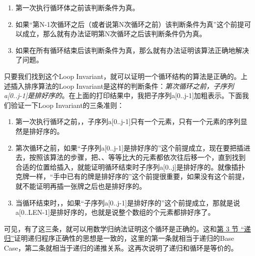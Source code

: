 \begin{enumerate}

\item 第一次执行循环体之前该判断条件为真。

\item 如果“第N-1次循环之后（或者说第N次循环之前）该判断条件为真”这个前提可以成立，那么就有办法证明第N次循环之后该判断条件仍为真。

\item 如果在所有循环结束后该判断条件为真，那么就有办法证明该算法正确地解决了问题。
\end{enumerate}


只要我们找到这个Loop Invariant，就可以证明一个循环结构的算法是正确的。上述插入排序算法的Loop Invariant是这样的判断条件：\emph{第次循环之前，子序列a[0.\BookSplit{}.\BookSplit{}j-1]是排好序的}。在上面的打印结果中，我把子序列a[0.\BookSplit{}.\BookSplit{}j-1]加粗表示。下面我们验证一下Loop Invariant的三条准则：


\begin{enumerate}

\item 第一次执行循环之前，，子序列a[0.\BookSplit{}.\BookSplit{}j-1]只有一个元素，只有一个元素的序列显然是排好序的。

\item 第次循环之前，如果“子序列a[0.\BookSplit{}.\BookSplit{}j-1]是排好序的”这个前提成立，现在要把插进去，按照该算法的步骤，把、、等等比大的元素都依次往后移一个，直到找到合适的位置给插入，就能证明循环结束时子序列a[0.\BookSplit{}.\BookSplit{}j]是排好序的。就像插扑克牌一样，“手中已有的牌是排好序的”这个前提很重要，如果没有这个前提，就不能证明再插一张牌之后也是排好序的。

\item 当循环结束时，，如果“子序列a[0.\BookSplit{}.\BookSplit{}j-1]是排好序的”这个前提成立，那就是说a[0.\BookSplit{}.\BookSplit{}LEN-1]是排好序的，也就是说整个数组的个元素都排好序了。
\end{enumerate}


可见，有了这三条，就可以用数学归纳法证明这个循环是正确的。这和\hyperlink{db.ch05s03.id2722951}{第 3 节 “递归”}证明递归程序正确性的思想是一致的，这里的第一条就相当于递归的Base Case，第二条就相当于递归的递推关系。这再次说明了递归和循环是等价的。

